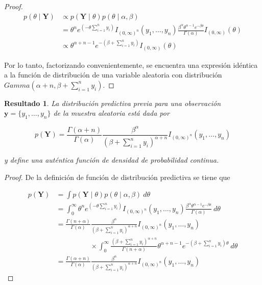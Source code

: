 \documentclass[
  10pt,
  spanish,
]{book}
\newtheorem{proposition}{Resultado}[chapter]
\theoremstyle{definition}
\theoremstyle{definition}
\theoremstyle{definition}
\theoremstyle{definition}
\theoremstyle{remark}
\begin{document}
\begin{proof}
\iffalse{} {Prueba. } \fi{}\begin{align*}
p(\theta \mid \mathbf{Y})&\propto p(\mathbf{Y} \mid \theta)p(\theta \mid \alpha,\beta)\\
&=\theta^n e^{(-\theta \sum_{i=1}^ny_i)}I_{(0,\infty)^n}(y_1,\ldots,y_n)\frac{\beta^\alpha \theta^{\alpha-1} e^{-\beta\theta}}{\Gamma(\alpha)}I_{(0,\infty)}(\theta)\\
&\propto \theta^{\alpha+n-1}e^{-(\beta+\sum_{i=1}^ny_i)}I_{(0,\infty)}(\theta)
\end{align*}

Por lo tanto, factorizando convenientemente, se encuentra una expresión idéntica a la función de distribución de una variable aleatoria con distribución \(Gamma(\alpha+n,\beta+\sum_{i=1}^ny_i)\).
\end{proof}

\begin{proposition}
\protect\hypertarget{prp:unnamed-chunk-55}{}{\label{prp:unnamed-chunk-55} }La distribución predictiva previa para una observación \(\mathbf{y}=\{y_1,\ldots,y_n\}\) de la muestra aleatoria está dada por

\begin{equation}
p(\mathbf{Y})=\frac{\Gamma(\alpha+n)}{\Gamma(\alpha)}\frac{\beta^\alpha}{(\beta+\sum_{i=1}^ny_i)^{\alpha+n}}
I_{(0,\infty)^n}(y_1,\ldots,y_n)
\end{equation}

y define una auténtica función de densidad de probabilidad continua.
\end{proposition}

\begin{proof}
\iffalse{} {Prueba. } \fi{}De la definición de función de distribución predictiva se tiene que

\begin{align*}
p(\mathbf{Y})&=\int p(\mathbf{Y} \mid \theta)p(\theta \mid \alpha,\beta)\ d\theta\\
&=\int_0^{\infty}\theta^n e^{(-\theta \sum_{i=1}^ny_i)}I_{(0,\infty)^n}(y_1,\ldots,y_n)\frac{\beta^\alpha \theta^{\alpha-1} e^{-\beta\theta}}{\Gamma(\alpha)} \ d\theta\\
&=\frac{\Gamma(n+\alpha)}{\Gamma(\alpha)}\frac{\beta^\alpha}{(\beta+\sum_{i=1}^ny_i)^{\alpha+n}}I_{(0,\infty)^n}(y_1,\ldots,y_n)\\
&\hspace{2cm}\times
\int_0^{\infty} \frac{(\beta+\sum_{i=1}^ny_i)^{\alpha+n}}{\Gamma(n+\alpha)} \theta^{\alpha+n-1}e^{-(\beta+\sum_{i=1}^ny_i)\theta}
\ d\theta\\
&=\frac{\Gamma(\alpha+n)}{\Gamma(\alpha)}\frac{\beta^\alpha}{(\beta+\sum_{i=1}^ny_i)^{\alpha+n}}I_{(0,\infty)^n}(y_1,\ldots,y_n)
\end{align*}
\end{proof}
\end{document}
